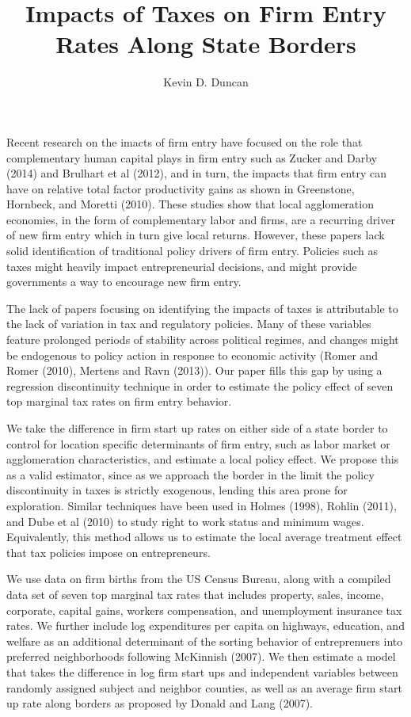 \documentclass[12 pt, a4paper]{article}
\begin{document}
\title{Impacts of Taxes on Firm Entry Rates Along State Borders}
\author{Kevin D. Duncan}
\maketitle

Recent research on the imacts of firm entry have focused on the role that complementary human capital plays in firm entry such as Zucker and Darby (2014) and Brulhart et al (2012), and in turn, the impacts that firm entry can have on relative total factor productivity gains as shown in Greenstone, Hornbeck, and Moretti (2010). These studies show that local agglomeration economies, in the form of complementary labor and firms, are a recurring driver of new firm entry which in turn give local returns. However, these papers lack solid identification of traditional policy drivers of firm entry. Policies such as taxes might heavily impact entrepreneurial decisions, and might provide governments a way to encourage new firm entry.

The lack of papers focusing on identifying the impacts of taxes is attributable to the lack of variation in tax and regulatory policies. Many of these variables feature prolonged periods of stability across political regimes, and changes might be endogenous to policy action in response to economic activity (Romer and Romer (2010), Mertens and Ravn (2013)). Our paper fills this gap by using a regression discontinuity technique in order to estimate the policy effect of seven top marginal tax rates on firm entry behavior. 

We take the difference in firm start up rates on either side of a state border to control for location specific determinants of firm entry, such as labor market or agglomeration characteristics, and estimate a local policy effect. We propose this as a valid estimator, since as we approach the border in the limit the policy discontinuity in taxes is strictly exogenous, lending this area prone for exploration. Similar techniques have been used in Holmes (1998), Rohlin (2011), and Dube et al (2010) to study right to work status and minimum wages. Equivalently, this method allows us to estimate the local average treatment effect that tax policies impose on entrepreneurs.

We use data on firm births from the US Census Bureau, along with a compiled data set of seven top marginal tax rates that includes property, sales, income, corporate, capital gains, workers compensation, and unemployment insurance tax rates. We further include log expenditures per capita on highways, education, and welfare as an additional determinant of the sorting behavior of entreprenuers into preferred neighborhoods following McKinnish (2007). We then estimate a model that takes the difference in log firm start ups and independent variables between randomly assigned subject and neighbor counties, as well as an average firm start up rate along borders as proposed by Donald and Lang (2007).
\end{document}
